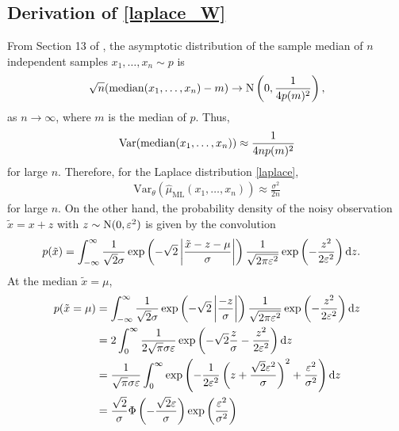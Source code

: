 \documentclass[11pt, a4paper]{article}
\def\t{\theta}
\begin{document}
\begin{appendix}	
	\section{Derivation of \eqref{laplace_W}}
	From Section 13 of \cite{ferguson2017course}, the asymptotic distribution of the sample median of $n$ independent samples $x_1,\dots,x_n \sim p$ is
	\begin{align*}
		\sqrt{n} ({\rm median}(x_1,\dots,x_n)-m) \to {\rm N} \left(0,\frac{1}{4 p(m)^2} \right),
	\end{align*}
	as $n \to \infty$, where $m$ is the median of $p$.
	Thus, 
	\begin{align}\label{median_var}
		{\rm Var} ({\rm median}(x_1,\dots,x_n)) \approx \frac{1}{4 n p(m)^2} %
	\end{align}
	for large $n$.
	Therefore, for the Laplace distribution \eqref{laplace},
	\begin{align}\label{laplace_var}
		\mathrm{Var}_{\t}(\hat{\mu}_{\mathrm{ML}}(x_1,\dots,x_n)) \approx \frac{\sigma^2}{2n}
	\end{align}
	for large $n$.
	On the other hand, the probability density of the noisy observation $\tilde{x}=x+z$ with $z \sim {\rm N}(0,\varepsilon^2)$ is given by the convolution
	\begin{align*}
		p(\tilde{x}) &= \int_{-\infty}^\infty \frac{1}{\sqrt{2} \sigma} \exp \left( -\sqrt{2} \left| \frac{\tilde{x}-z-\mu}{\sigma} \right| \right) \frac{1}{\sqrt{2 \pi \varepsilon^2}} \exp \left( -\frac{z^2}{2 \varepsilon^2} \right) {\rm d} z.
	\end{align*}
	At the median $\tilde{x}=\mu$,
	\begin{align*}
		p(\tilde{x}=\mu) &= \int_{-\infty}^\infty \frac{1}{\sqrt{2} \sigma} \exp \left( -\sqrt{2} \left| \frac{-z}{\sigma} \right| \right) \frac{1}{\sqrt{2 \pi \varepsilon^2}} \exp \left( -\frac{z^2}{2 \varepsilon^2} \right) {\rm d} z \\
		&= 2 \int_{0}^\infty \frac{1}{2 \sqrt{\pi} \sigma \varepsilon} \exp \left( -\sqrt{2} \frac{z}{\sigma} -\frac{z^2}{2 \varepsilon^2} \right) {\rm d} z \\
		&= \frac{1}{\sqrt{\pi} \sigma \varepsilon}  \int_{0}^\infty \exp \left( -\frac{1}{2 \varepsilon^2} \left( z+\frac{\sqrt{2} \varepsilon^2}{\sigma} \right)^2 + \frac{\varepsilon^2}{\sigma^2 } \right) {\rm d} z \\
		&= \frac{\sqrt{2}}{\sigma} \Phi \left( -\frac{\sqrt{2} \varepsilon}{\sigma} \right) \exp \left( \frac{\varepsilon^2}{\sigma^2 } \right) \\

\end{align*}
\end{appendix}
\end{document}
